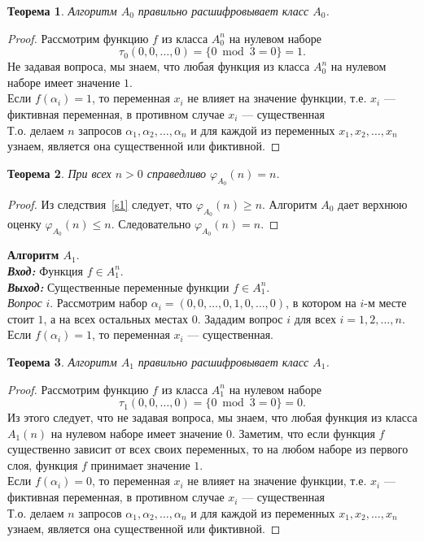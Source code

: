\documentclass[oneside, final, 14pt]{extreport}
\newtheorem{thm}{Теорема}
\begin{document}
	 \begin{thm} 
	 	Алгоритм $A_0$ правильно расшифровывает класс $A_0$. 
	 \end{thm}
	 \begin{proof}
	 	Рассмотрим функцию $f$  из класса $A_0^n$ на нулевом наборе
	 	\[
	 	\tau_0(0, 0, \ldots, 0) =  \{0  \bmod 3 = 0\} = 1.
	 	\]
	 	Не задавая вопроса, мы знаем, что любая функция из класса $A_0^n$ на нулевом наборе имеет значение $1$.\\
	 	Если $f(\alpha_i) = 1$, то переменная $x_i$ не влияет на значение функции, т.е. $x_i$ --- 
	 	фиктивная переменная, в противном случае $x_i$ --- существенная \\
	 	Т.о. делаем $n$  запросов $\alpha_1, \alpha_2, \ldots, \alpha_n$ и для каждой из переменных $x_1, x_2, \ldots, x_n$ узнаем, является она существенной 
	 	или фиктивной. 
	 \end{proof} \par
	 
	\begin{thm} 
		При всех $n>0$ справедливо $\varphi_{A_0}(n) = n$.
	\end{thm}
	\begin{proof}
		Из следствия~\ref{s1} следует, что $\varphi_{A_0}(n) \geq n$. Алгоритм $A_0$ дает верхнюю оценку $\varphi_{A_0}(n) \leq n$. Следовательно 
		$\varphi_{A_0}(n) = n$.
	\end{proof} \par
	\noindent\textbf{Алгоритм $A_1$}. \\
	\emph{\textbf{Вход:}} Функция $f \in A_1^n$.\\
	\emph{\textbf{Выход:}} Существенные переменные функции $f \in A_1^n$.\\
	\emph{Вопрос} $i$. Рассмотрим набор $\alpha_i = (0, 0,  \ldots, 0, 1, 0, \ldots, 0)$, в котором на $i$-м месте стоит $1$, а на всех остальных местах $0$.
	Зададим вопрос $i$ для всех $i = 1, 2, \ldots, n$. Если $f(\alpha_i) = 1$, то переменная $x_i$ --- существенная. \\ 
	
	\begin{thm} 
		Алгоритм $A_1$ правильно расшифровывает класс $A_1$. 
	\end{thm}
	\begin{proof}
		Рассмотрим функцию $f$  из класса $A_1^n$ на нулевом наборе
		\[
		\tau_1(0, 0, \ldots, 0) =  \{0 \bmod  3 = 0\} = 0.
		\]
		Из этого следует, что не задавая вопроса, мы знаем, что любая функция из класса $A_1(n)$ на нулевом наборе имеет значение $0$.
		Заметим, что если функция $f$ существенно зависит от всех своих переменных, то на любом наборе из первого слоя, функция $f$ принимает
		значение $1$.\\
		Если $f(\alpha_i) = 0$, то переменная $x_i$ не влияет на значение функции, т.е. $x_i$ --- 
		фиктивная переменная, в противном случае $x_i$ --- существенная \\
		Т.о. делаем $n$  запросов $\alpha_1, \alpha_2, \ldots, \alpha_n$ и для каждой из переменных $x_1, x_2, \ldots, x_n$ узнаем, является она существенной 
		или фиктивной.
	\end{proof} \par
	
\end{document}

